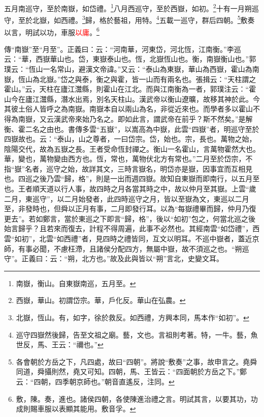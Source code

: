 五月南巡守，至於南嶽，如岱禮。\footnote{南嶽，衡山。自東嶽南巡，五月至。}八月西巡守，至於西嶽，如初。\footnote{西嶽，華山。初謂岱宗。華，戶化反。華山在弘農。}十有一月朔巡守，至於北嶽，如西禮。\footnote{北嶽，恆山。有，如字，徐於救反。如西禮，方興本同，馬本作“如初”。}歸，格於藝祖，用特。\footnote{巡守四嶽然後歸，告至文祖之廟。藝，文也。言祖則考著。特，一牛。藝，魚世反，馬、王云：“禰也。”}五載一巡守，群后四朝。\footnote{各會朝於方岳之下，凡四處，故曰“四朝”。將說“敷奏”之事，故申言之。堯舜同道，舜攝則然，堯又可知。四朝，馬、王皆云：“四面朝於方岳之下。”鄭云：“四朝，四季朝京師也。”朝音直遙反，注同。}敷奏以言，明試以功，車服\textcolor{red}{以庸}。\footnote{敷，陳。奏，進也。諸侯四朝，各使陳進治禮之言。明試其言，以要其功，功成則賜車服以表顯其能用。敷音孚。}

{\noindent\zhuan{}\fzbyks 傳“南嶽”至“月至”。正義曰：云：“河南華，河東岱，河北恆，江南衡。”李巡云：“華，西嶽華山也。岱，東嶽泰山也。恆，北嶽恆山也。衡，南嶽衡山也。”郭璞云：“恆山一名常山，避漢文帝諱。”又云：“泰山為東嶽，華山為西嶽，霍山為南嶽，恆山為北嶽。”岱之與泰，衡之與霍，皆一山而有兩名也。張揖云：“天柱謂之霍山。”云，天柱在廬江灊縣，則霍山在江北。而與江南衡為一者，郭璞注云：“霍山今在廬江灊縣，潛水出焉，別名天柱山。漢武帝以衡山遼曠，故移其神於此。今其彼土俗人皆呼之為南嶽。南嶽本自以兩山為名，非從近來也。而學者多以霍山不得為南嶽，又云漢武帝來始乃名之。即如此言，謂武帝在前乎？斯不然矣。”是解衡、霍二名之由也。書傳多雲“五嶽”，以嵩高為中嶽，此雲“四嶽”者，明巡守至於四嶽故也。云：“泰山，山之尊者，一曰岱宗。岱，始也。宗，長也。萬物之始，陰陽交代，故為五嶽之長。王者受命恆封禪之。衡山一名霍山，言萬物霍然大也。華，變也，萬物變由西方也。恆，常也，萬物伏北方有常也。”二月至於岱宗，不指“嶽”名者，巡守之始，故詳其文，三時言嶽名，明岱亦是嶽，因事宜而互相見也。四巡之後乃雲“歸，格”，則是一出而週四嶽。故知自東嶽而即南行，以五月至也。王者順天道以行人事，故四時之月各當其時之中，故以仲月至其嶽。上雲“歲二月，東巡守”，以二月始發者，此四時巡守之月，皆以至嶽為文，東巡以二月至，非發時也，但舜以正月有事，二月即發行耳。以為“每嶽禮畢而歸，仲月乃復更去”。若如鄭言，當於東巡之下即言“歸，格”，後以“如初”包之，何當北巡之後始言歸乎？且若來而復去，計程不得周遍，此事不必然也。其經南雲“如岱禮”，西雲“如初”，北雲“如西禮”者，見四時之禮皆同，互文以明耳。不巡中嶽者，蓋近京師，有事必聞，不慮枉滯，且諸侯分配四方，無屬中嶽，故不須巡之也。“朔巡守”。正義曰：云：“朔，北方也。”故及此與皆以“朔”言北，史變文耳。 \par}

